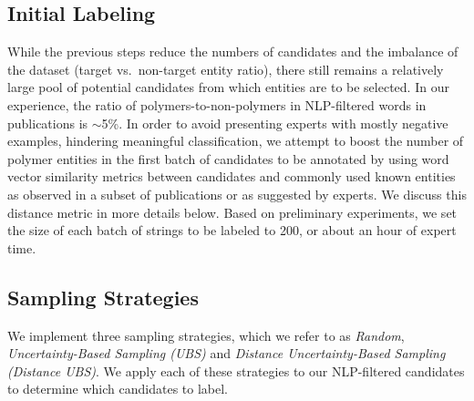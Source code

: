 \subsection{Initial Labeling}
While the previous steps
 reduce the numbers of candidates and the imbalance of the dataset (target vs.\ non-target entity ratio), 
 there still remains a relatively large pool of potential candidates from which entities are to be selected.
In our experience, the ratio of polymers-to-non-polymers in NLP-filtered words in publications is $\sim$5\%.
In order to avoid presenting experts with mostly negative examples, hindering meaningful classification,
we attempt to boost the number of polymer entities in the first batch of candidates to be annotated by using word vector similarity metrics between candidates and commonly used known entities as observed in a subset of publications or as suggested by experts.
We discuss this distance metric in more details below.
Based on preliminary experiments, we set the size of each batch of strings to be labeled to 200, 
or about an hour of expert time.

\subsection{Sampling Strategies}
We implement three sampling strategies, which we refer to as \textit{Random}, \textit{Uncertainty-Based Sampling (UBS)} and \textit{Distance Uncertainty-Based Sampling (Distance UBS)}.
We apply each of these strategies to our NLP-filtered candidates to determine which candidates to label.

